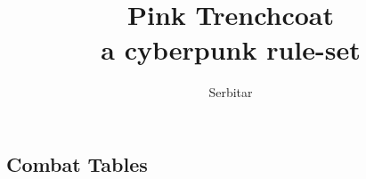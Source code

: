 \documentclass[10pt, a4paper,twocolumn, oneside]{book}
\title{Pink Trenchcoat \\ \small{a cyberpunk rule-set}}
\author{Serbitar}
\begin{document}
\maketitle

\tableofcontents








\cleardoublepage
{}
\listoftables
\listoffigures
{}
\printindex

\begin{appendix}
  \chapter{Combat Tables}

  \onecolumn


  \begin{table}[htb]
    \begin{minipage}[b]{0.5\linewidth}
    \end{minipage}
  \end{table}


\end{appendix}
\end{document}
